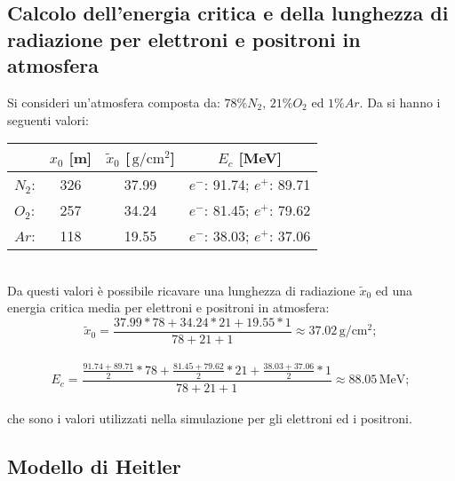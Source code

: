 \documentclass[10pt,a4paper,usenatbib]{article}
\newcommand*{\unit}[1]{\ensuremath{\mathrm{\,#1}}}                              %
\begin{document}
\subsection{Calcolo dell'energia critica e della lunghezza di radiazione per elettroni e positroni in atmosfera}
Si consideri un'atmosfera composta da: $78\% N_2$, $21\% O_2$ ed $1\% Ar$. Da \cite{Olive:2016xmw} si hanno i seguenti valori: 
\begin{table}[h!]
\centering
\begin{tabular}{lccc}
\toprule
                      &   $x_0$ [m]   &   $\tilde{x}_0$ [$\unit{g/cm^2}$]   &   $E_c$ [MeV]                  \\                          
\midrule
$N_2$:          &   326              &   37.99                               &  $e^-$: 91.74; $e^+$: 89.71        \\
$O_2$:          &   257              &   34.24                               &  $e^-$: 81.45; $e^+$: 79.62         \\
$Ar$:             &   118              &   19.55                               &  $e^-$: 38.03; $e^+$: 37.06          \\
\bottomrule
\end{tabular}
\end{table}
\\Da questi valori è possibile ricavare una lunghezza di radiazione $\tilde{x}_0$ ed una energia critica media per elettroni e positroni in atmosfera: \\
\begin{equation*}
\tilde{x}_0 = \frac{37.99*78+34.24*21+19.55*1}{78+21+1} \approx 37.02\unit{g/cm^2};
\end{equation*}
\\
\begin{equation*}
E_c = \frac{\frac{91.74 + 89.71}{2}*78+\frac{81.45 + 79.62}{2}*21+\frac{38.03 + 37.06}{2}*1}{78+21+1} \approx 88.05\unit{MeV};
\end{equation*}
\\che sono i valori utilizzati nella simulazione per gli elettroni ed i positroni. 


\subsection{Modello di Heitler}
\end{document}
